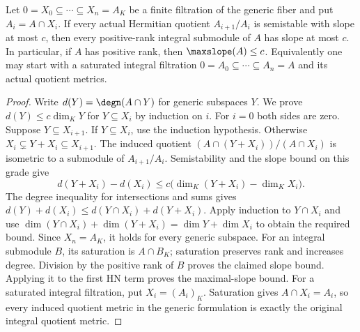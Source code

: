 \begin{lemma}
\label{lem:filtered-slope-bound}\leanok
Let $0=X_0\subseteq\cdots\subseteq X_n=A_K$ be a finite filtration
of the generic fiber and put $A_i=A\cap X_i$. If every actual
Hermitian quotient $A_{i+1}/A_i$ is semistable with slope at most $c$,
then every positive-rank integral submodule of $A$ has slope at most $c$.
In particular, if $A$ has positive rank, then $\maxslope(A)\leq c$.
Equivalently one may start with a saturated integral filtration
$0=A_0\subseteq\cdots\subseteq A_n=A$ and its actual quotient metrics.
\end{lemma}
\begin{proof}
Write $d(Y)=\degn(A\cap Y)$ for generic subspaces $Y$.
We prove $d(Y)\leq c\dim_KY$ for $Y\subseteq X_i$ by induction on
$i$. For $i=0$ both sides are zero. Suppose $Y\subseteq X_{i+1}$.
If $Y\subseteq X_i$, use the induction hypothesis. Otherwise
$X_i\subsetneq Y+X_i\subseteq X_{i+1}$. The induced quotient
$(A\cap(Y+X_i))/(A\cap X_i)$ is isometric to a submodule of
$A_{i+1}/A_i$. Semistability and the slope bound on this grade give
\[
 d(Y+X_i)-d(X_i)\leq
 c\bigl(\dim_K(Y+X_i)-\dim_KX_i\bigr).
\]
The degree inequality for intersections and sums gives
$d(Y)+d(X_i)\leq d(Y\cap X_i)+d(Y+X_i)$.
Apply induction to $Y\cap X_i$ and use
$\dim(Y\cap X_i)+\dim(Y+X_i)=\dim Y+\dim X_i$ to obtain the
required bound. Since $X_n=A_K$, it holds for every generic subspace.
For an integral submodule $B$, its saturation is $A\cap B_K$;
saturation preserves rank and increases degree. Division by the
positive rank of $B$ proves the claimed slope bound. Applying it to
the first HN term proves the maximal-slope bound.
For a saturated integral filtration, put $X_i=(A_i)_K$.
Saturation gives $A\cap X_i=A_i$, so every induced quotient metric
in the generic formulation is exactly the original integral quotient metric.
\end{proof}

